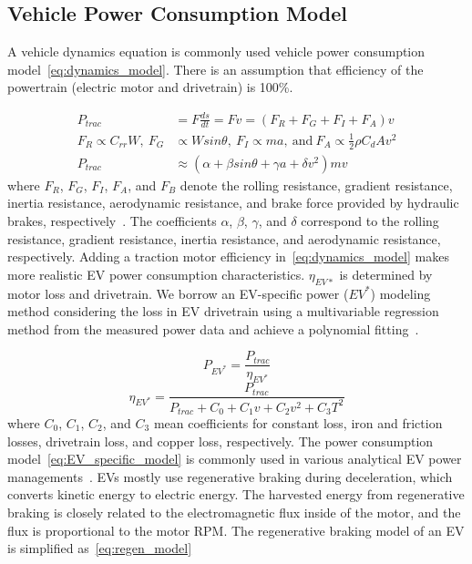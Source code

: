 \documentclass{IEEEtran}
\begin{document}
\subsection{Vehicle Power Consumption Model}

A vehicle dynamics equation is commonly used vehicle power consumption model~\eqref{eq:dynamics_model}. There is an assumption that efficiency of the powertrain (electric motor and drivetrain) is 100\%. 

\begin{equation}  \label{eq:dynamics_model} %
\begin{split}
P_{trac}	&= F \frac{ds}{dt} = Fv= (F_{R} + F_{G} + F_{I} + F_{A}) v \\
F_{R} \propto C_{rr}W,~F_{G} &\propto Wsin\theta,~F_{I} \propto ma,~\text{and}~F_{A} \propto \frac{1}{2} \rho C_d Av^2 \\
P_{trac} &\approx (\alpha  + \beta sin\theta + \gamma a + \delta v^2)mv
\end{split}
\end{equation}
where $F_R$, $F_G$, $F_I$, $F_A$, and $F_B$ denote the rolling resistance, gradient resistance, inertia resistance, aerodynamic resistance, and brake force provided by hydraulic brakes, respectively~\cite{Park:DAC13}. The coefficients $\alpha$, $\beta$, $\gamma$, and $\delta$ correspond to the rolling resistance, gradient resistance, inertia resistance, and aerodynamic resistance, respectively.
Adding a traction motor efficiency in~\eqref{eq:dynamics_model} makes more realistic EV power consumption characteristics. $\eta_{EV*}$ is determined by motor loss and drivetrain.  
We borrow an EV-specific power ($EV^*$) modeling method considering the loss in EV drivetrain using a multivariable regression method from the measured power data and achieve a polynomial fitting~\cite{Hong:ASPDAC16}.

\begin{equation} \label{eq:EV_specific_model} %
P_{EV^*} = \frac{P_{trac}}{\eta_{EV^*}}
\end{equation} 
\begin{equation}
\eta_{EV^*} = \frac{P_{trac}}{{P_{trac} + C_0 + C_1 v + C_2 v^2 + C_3 T^2}}\nonumber
\end{equation}	
where $C_0$, $C_1$, $C_2$, and $C_3$ mean coefficients for constant loss, iron and friction losses, drivetrain loss, and copper loss, respectively. The power consumption model~\eqref{eq:EV_specific_model} is commonly used in various analytical EV power managements~\cite{Dib:IVPPC11, Dib:CEP14}.
EVs mostly use regenerative braking during deceleration, which converts kinetic energy to electric energy. The harvested energy from regenerative braking is closely related to the electromagnetic flux inside of the motor, and the flux is proportional to the motor RPM. The regenerative braking model of an EV is simplified as~\eqref{eq:regen_model} 
\end{document}
